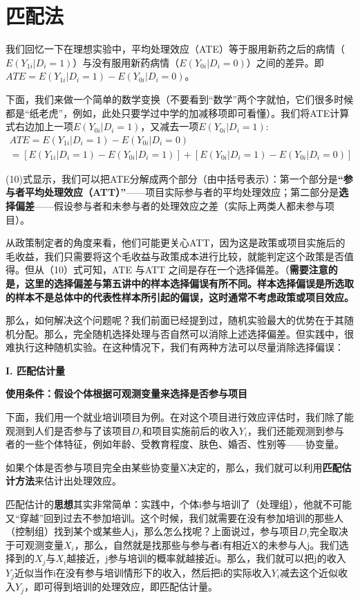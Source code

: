 \documentclass[cn,12pt,math=newtx,citestyle=gb7714-2015,bibstyle=gb7714-2015]{elegantbook}
\begin{document}
	\section{匹配法}
	
	我们回忆一下在理想实验中，平均处理效应（ATE）等于服用新药之后的病情（$E(Y_{1i}\big|D_i=1)$）与没有服用新药病情（$E(Y_{0i}\big|D_i=0)$）之间的差异。即
	$ATE=E(Y_{1i}\big|D_i=1)-E(Y_{0i}\big|D_i=0)$。
	
	下面，我们来做一个简单的数学变换（不要看到“数学”两个字就怕，它们很多时候都是“纸老虎”，例如，此处只要学过中学的加减移项即可看懂）。我们将ATE计算式右边加上一项$E(Y_{0i}\big|D_i=1)$，又减去一项$E(Y_{0i}\big|D_i=1)$:
	\begin{gather}
		ATE=E(Y_{1i}\big|D_i=1)-E(Y_{0i}\big|D_i=0)\nonumber\\
		=[E(Y_{1i}\big|D_i=1)-E(Y_{0i}\big|D_i=1)]+[E(Y_{0i}\big|D_i=1)-E(Y_{0i}\big|D_i=0)]
	\end{gather}
	
	(10)式显示，我们可以把ATE分解成两个部分（由中括号表示）：第一个部分是\textbf{“参与者平均处理效应（ATT）”}——项目实际参与者的平均处理效应；第二部分是\textbf{选择偏差}——假设参与者和未参与者的处理效应之差（实际上两类人都未参与项目）。
	
	从政策制定者的角度来看，他们可能更关心ATT，因为这是政策或项目实施后的毛收益，我们只需要将这个毛收益与政策成本进行比较，就能判定这个政策是否值得。但从（10）式可知，ATE 与ATT 之间是存在一个选择偏差。（\textbf{需要注意的是，这里的选择偏差与第五讲中的样本选择偏误有所不同。样本选择偏误是所选取的样本不是总体中的代表性样本所引起的偏误，这时通常不考虑政策或项目效应。}
	
	那么，如何解决这个问题呢？我们前面已经提到过，随机实验最大的优势在于其随机分配。那么，完全随机选择处理与否自然可以消除上述选择偏差。但实践中，很难执行这种随机实验。在这种情况下，我们有两种方法可以尽量消除选择偏误：
	
	\textbf{I. 匹配估计量}
	
	\textbf{使用条件：假设个体根据可观测变量来选择是否参与项目}
	
	下面，我们用一个就业培训项目为例。在对这个项目进行效应评估时，我们除了能观测到人们是否参与了该项目$D_i$和项目实施前后的收入$Y_i$，我们还能观测到参与者的一些个体特征，例如年龄、受教育程度、肤色、婚否、性别等——协变量。
	
	如果个体是否参与项目完全由某些协变量X决定的，那么，我们就可以利用\textbf{匹配估计方法}来估计出处理效应。
	
	匹配估计的\textbf{思想}其实非常简单：实践中，个体i参与培训了（处理组），他就不可能又“穿越”回到过去不参加培训。这个时候，我们就需要在没有参加培训的那些人（控制组）找到某个或某些人j，那么怎么找呢？上面说过，参与项目$D_i$完全取决于可观测变量$X_i$，那么，自然就是找那些与参与者i有相近X的未参与人j。我们选择到的$X_j$与$X_i$越接近，j参与培训的概率就越接近i。那么，我们就可以把j的收入$Y_j$近似当作i在没有参与培训情形下的收入，然后把i的实际收入$Y_i$减去这个近似收入$Y_j$，即可得到培训的处理效应，即匹配估计量。
	
\end{document}
